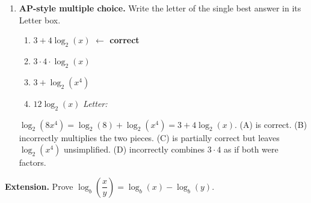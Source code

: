 \documentclass[10pt]{article}
\begin{document}
\begin{enumerate}[leftmargin=1.8em, itemsep=14pt]
\item \textbf{AP-style multiple choice.} Write the letter of the single best answer in its Letter box.

\begin{enumerate}[leftmargin=2em, itemsep=4pt, label=(\Alph*)]
  \item $3 + 4\log_2(x)$ \quad \textcolor{keyred}{\textbf{$\leftarrow$ correct}}
  \item $3 \cdot 4 \cdot \log_2(x)$
  \item $3 + \log_2(x^4)$
  \item $12\log_2(x)$ \hfill\textit{Letter:}~\gradedblank[id=hw6, type=choice, points=1, answer=A]{0.42in}{13pt}
\end{enumerate}

\begin{teachernote}
$\log_2(8x^4) = \log_2(8) + \log_2(x^4) = 3 + 4\log_2(x)$. (A) is correct.
(B) incorrectly multiplies the two pieces. (C) is partially correct but leaves $\log_2(x^4)$
unsimplified. (D) incorrectly combines $3 \cdot 4$ as if both were factors.
\end{teachernote}

\end{enumerate}

\vspace{0.12in}

\begin{practicebox}
\textbf{Extension.} Prove $\log_b\!\left(\dfrac{x}{y}\right) = \log_b(x) - \log_b(y)$.

\end{practicebox}
\end{document}
